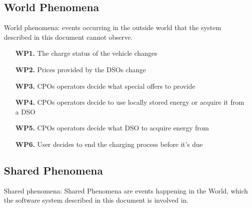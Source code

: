 \documentclass[12pt]{report}
\begin{document}
\bigskip

\subsection{World Phenomena}
World phenomena: events occurring in the outside world that the system described in this document cannot observe.
\begin{itemize}
    \item[\textbf{WP1.}] The charge status of the vehicle changes
    \item[\textbf{WP2.}] Prices provided by the DSOs change
    \item[\textbf{WP3.}] CPOs operators decide what special offers to provide
    \item[\textbf{WP4.}] CPOs operators decide to use locally stored energy or acquire it from a DSO
    \item[\textbf{WP5.}] CPOs operators decide what DSO to acquire energy from
    \item[\textbf{WP6.}] User decides to end the charging process before it's due
\end{itemize}


\subsection{Shared Phenomena}
Shared phenomena: Shared Phenomena are events happening in the World, which the software system described in this document is involved in.
\end{document}
